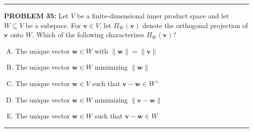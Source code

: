 \documentclass[12pt]{amsart}
\newcommand{\divider}{
  \vspace{-1em} %
  \noindent
  \raisebox{-0.15ex}{\textbullet}%
  \hspace{0.5em}%
  \rule[0.5ex]{0.95\textwidth}{1.0pt}%
  \hspace{0.5em}%
  \raisebox{-0.15ex}{\textbullet}%
  \vspace{0em} %
}
\newcommand{\norm}[1]{\|#1\|}
\begin{document}
\divider

{\bf PROBLEM 35:}
%
Let $V$ be a finite-dimensional inner product space and let $W \subseteq V$
be a subspace.  For $\mathbf{v} \in V$, let $\Pi_W(\mathbf{v})$ denote
the orthogonal projection of $\mathbf{v}$ onto $W$.  Which of the
following characterizes $\Pi_W(\mathbf{v})$?
%
\begin{enumerate}[(A)]
\item The unique vector $\mathbf{w} \in W$ with $\norm{\mathbf{w}} = \norm{\mathbf{v}}$
\item The unique vector $\mathbf{w} \in W$ minimizing $\norm{\mathbf{w}}$
\item The unique vector $\mathbf{w} \in V$ such that $\mathbf{v} - \mathbf{w} \in W^\perp$
\item The unique vector $\mathbf{w} \in W$ minimizing $\norm{\mathbf{v} - \mathbf{w}}$
\item The unique vector $\mathbf{w} \in W$ such that $\mathbf{v} - \mathbf{w} \in W$
\end{enumerate}
%
%
%
%
%
\divider
\end{document}

